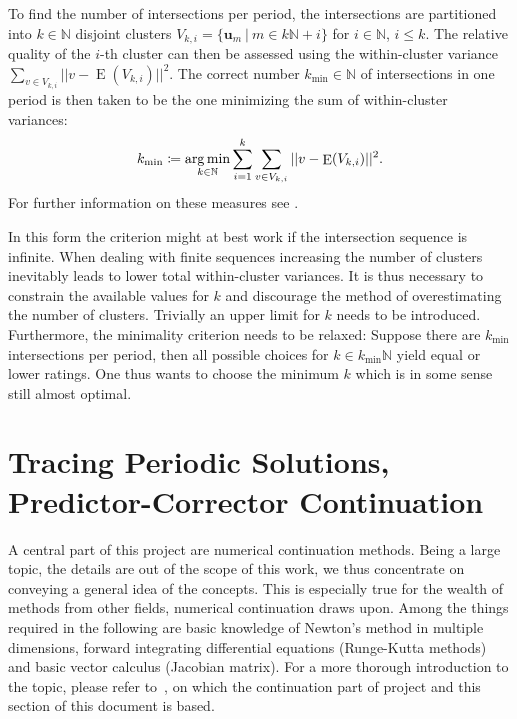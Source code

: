 \documentclass[a4paper,oneside,10pt]{article}
\newcommand\N{\mathbb{N}}
\DeclareMathOperator*\argmin{arg\,min}
\DeclareMathOperator\E{E}
\let\oldsection\section
\renewcommand\section{\clearpage\oldsection}
\begin{document}
To find the number of intersections per period, the intersections are partitioned into $k \in \N$ disjoint clusters $V_{k,i} = \{ \textbf{u}_m\ |\ m \in k\N+i \}$ for $i \in \N$, $i \le k$.
The relative quality of the $i$-th cluster can then be assessed using the within-cluster variance $\sum_{v \in V_{k,i} } ||v - \E(V_{k,i})||^2$.
The correct number $k_{\text{min}} \in \N$ of intersections in one period is then taken to be the one minimizing the sum of within-cluster variances:
\[
	k_\text{min} \coloneqq \argmin_{k \in \N} \sum_{i = 1}^k \sum_{v \in V_{k,i} } ||v - \E(V_{k,i})||^2 \text.
\]
For further information on these measures see \cite{halkidi2001clustering}. %

In this form the criterion might at best work if the intersection sequence is infinite.
When dealing with finite sequences increasing the number of clusters inevitably leads to lower total within-cluster variances.
It is thus necessary to constrain the available values for $k$ and discourage the method of overestimating the number of clusters.
Trivially an upper limit for $k$ needs to be introduced.
Furthermore, the minimality criterion needs to be relaxed: Suppose there are $k_\text{min}$ intersections per period, then all possible choices for $k \in k_\text{min}\N$ yield equal or lower ratings.
One thus wants to choose the minimum $k$ which is in some sense still almost optimal.






\section{Tracing Periodic Solutions, Predictor-Corrector Continuation}
\label{sec:cont}

A central part of this project are numerical continuation methods.
Being a large topic, the details are out of the scope of this work, we thus concentrate on conveying a general idea of the concepts.
This is especially true for the wealth of methods from other fields, numerical continuation draws upon.
Among the things required in the following are basic knowledge of Newton's method in multiple dimensions, forward integrating differential equations (Runge-Kutta methods) and basic vector calculus (Jacobian matrix).
For a more thorough introduction to the topic, please refer to~\cite{allgower1990numerical}, on which the continuation part of project and this section of this document is based.
\end{document}
